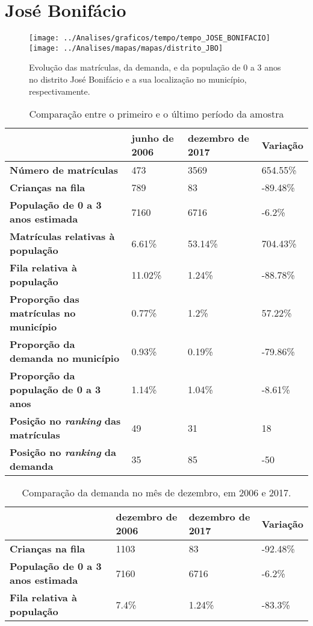 \section{José Bonifácio}
\begin{figure}[H]
\centering
\texttt{[image: ../Analises/graficos/tempo/tempo\_JOSE\_BONIFACIO]}
\texttt{[image: ../Analises/mapas/mapas/distrito\_JBO]}
\caption{Evolução das matrículas, da demanda, e da população de 0 a 3 anos no distrito José Bonifácio e a sua localização no município, respectivamente.}
\end{figure}
\begin{table}[H]
\begin{tabular}{l|l|l|l}
\textbf{}                                      & \textbf{junho de 2006}       & \textbf{dezembro de 2017}    & \textbf{Variação} \\ \hline
\textbf{Número de matrículas}                  & 473 & 3569 & 654.55\% \\ \hline
\textbf{Crianças na fila}                      & 789 & 83 & -89.48\% \\ \hline
\textbf{População de 0 a 3 anos estimada}      & 7160 & 6716 & -6.2\% \\ \hline
\textbf{Matrículas relativas à população}      & 6.61\% & 53.14\% & 704.43\% \\ \hline
\textbf{Fila relativa à população}             & 11.02\% & 1.24\% & -88.78\% \\ \hline
\textbf{Proporção das matrículas no município} & 0.77\% & 1.2\% & 57.22\% \\ \hline
\textbf{Proporção da demanda no município}     & 0.93\% & 0.19\% & -79.86\% \\ \hline
\textbf{Proporção da população de 0 a 3 anos}  & 1.14\% & 1.04\% & -8.61\% \\ \hline
\textbf{Posição no \textit{ranking} das matrículas}     & 49 & 31 & 18 \\ \hline
\textbf{Posição no \textit{ranking} da demanda}         & 35 & 85 & -50 \\ 
\end{tabular}
\caption{Comparação entre o primeiro e o último período da amostra}
\end{table}
\begin{table}[H]
\begin{tabular}{l|l|l|l}
\textbf{}                                 & \textbf{dezembro de 2006} & \textbf{dezembro de 2017} & \textbf{Variação} \\ \hline
\textbf{Crianças na fila}                      & 1103 & 83 & -92.48\% \\ \hline
\textbf{População de 0 a 3 anos estimada}      & 7160 & 6716 & -6.2\% \\ \hline
\textbf{Fila relativa à população}             & 7.4\% & 1.24\% & -83.3\% \\
\end{tabular}
\caption{Comparação da demanda no mês de dezembro, em 2006 e 2017.}
\end{table}
